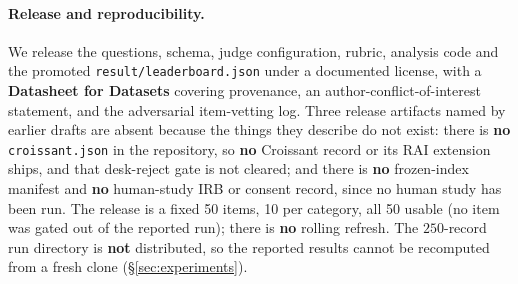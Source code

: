 \paragraph{Release and reproducibility.} We release the questions, schema, judge configuration, rubric, analysis code and the promoted \texttt{result/leaderboard.json} under a documented license, with a \textbf{Datasheet for Datasets} \citep{gebru2021datasheets} covering provenance, an author-conflict-of-interest statement, and the adversarial item-vetting log. Three release artifacts named by earlier drafts are absent because the things they describe do not exist: there is \textbf{no} \texttt{croissant.json} in the repository, so \textbf{no} Croissant record or its RAI extension \citep{croissant2024} ships, and that desk-reject gate is not cleared; and there is \textbf{no} frozen-index manifest and \textbf{no} human-study IRB or consent record, since no human study has been run. The release is a fixed 50 items, 10 per category, all 50 usable (no item was gated out of the reported run); there is \textbf{no} rolling refresh. The $250$-record run directory is \textbf{not} distributed, so the reported results cannot be recomputed from a fresh clone (\S\ref{sec:experiments}).
